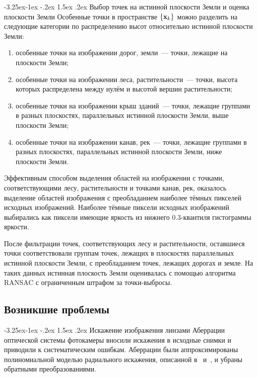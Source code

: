 \documentclass[a4paper,12pt]{article}
\makeatletter
\renewcommand\paragraph{\@startsection{paragraph}{4}{\z@}%
  {-3.25ex\@plus -1ex \@minus -.2ex}%
  {1.5ex \@plus .2ex}%
  {\normalfont\normalsize\bfseries}}
\makeatother
\begin{document}
\paragraph{Выбор точек на истинной плоскости Земли и оценка плоскости Земли}
Особенные точки в пространстве $\cbr{ \mathbf{x}_k }$ можно разделить на 
следующие категории по распределению высот относительно истинной плоскости 
Земли:
\begin{enumerate}
  \item особенные точки на изображении дорог, земли~--- точки, лежащие на
  плоскости Земли;
  \item особенные точки на изображении леса, растительности~---
  точки, высота которых распределена между нулём и высотой вершин 
  растительности;
  \item особенные точки на изображении крыш зданий~--- точки, лежащие 
  группами в разных плоскостях, параллельных истинной плоскости Земли, выше 
  плоскости Земли;
  \item особенные точки на изображении канав, рек~--- точки, лежащие 
  группами в разных плоскостях, параллельных истинной плоскости Земли, ниже 
  плоскости Земли.
\end{enumerate}

Эффективным способом выделения областей на изображении с точками, 
соответствующими лесу, растительности и точками канав, рек, оказалось 
выделение областей изображения с преобладанием наиболее тёмных пикселей 
исходных изображений.
Наиболее тёмные пиксели исходных изображений выбирались как пиксели имеющие 
яркость из нижнего 0.3-квантиля гистограммы яркости. 

После фильтрации точек, соответствующих лесу и растительности, 
оставшиеся точки соответствовали группам точек, лежащих в 
плоскостях параллельных истинной плоскости Земли, с преобладанием точек, 
лежащих дорогах и земле.
На таких данных истинная плоскость Земли оценивалась с помощью алгоритма 
RANSAC с ограниченным штрафом за точки-выбросы.


\subsection{Возникшие проблемы}
\paragraph{Искажение изображения линзами}%
Аберрации оптической системы фотокамеры вносили искажения в исходные снимки 
и приводили к систематическим ошибкам.
Аберрации были аппроксимированы полиномиальной моделью радиального искажения, 
описанной в~\cite{forsythponce04compvis} и~\cite{szelisky10compvis}, 
и убраны обратными преобразованиями.
\end{document}
